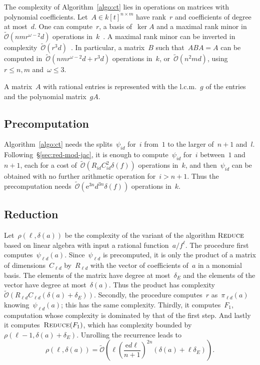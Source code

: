 \documentclass{sig-alternate}
\newcommand{\Reduce}{\mathop{\textsc{Reduce}}}
\newcommand{\softO}{\tilde{\mathcal{O}}}
\newcommand{\eexp}{\mathrm{e}}
\begin{document}
\noindent The complexity of Algorithm~\ref{algo:ct} lies in operations on matrices with polynomial coefficients.
Let~$A\in k[t]^{n\times m}$ have rank~$r$ and coefficients of degree at most~$d$.
One can compute~$r$, a basis of~$\ker A$ and a maximal rank minor in~$\softO(n m r^{\omega-2} d)$ operations in~$k$~\cite{Zho13}.
A maximal rank minor can be inverted in complexity~$\softO(r^3 d)$~\cite{JeaVil05}.
In particular, a matrix~$B$ such that~$ABA=A$ can be computed in~$ \softO(n m r^{\omega-2} d + r^3 d)$ operations in~$k$, or~$\softO(n^2md)$, using~$r\leqslant n,m$ and~$\omega\leqslant3$.


A matrix~$A$ with rational entries is represented with the l.c.m.~$g$ of the entries and the polynomial matrix~$g A$. 
\subsection{Precomputation}

\noindent Algorithm~\ref{algo:ct} needs the splits~$\psi_{id}$ for~$i$ from~$1$ to the larger of~$n+1$ and~$l$.
Following~\S\ref{sec:red-mod-jac}, it is enough to compute~$\psi_{id}$ for~$i$ between~$1$ and~$n+1$, each for a cost of~$\softO(R_{id}C_{id}^2\delta(f))$ operations in~$k$,
and then~$\psi_{id}$ can be obtained with no further arithmetic operation for~$i>n+1$.
Thus the precomputation needs~$\softO\left( \eexp^{3n}d^{3n}\delta(f) \right)$  operations in~$k$.

\subsection{Reduction}

\noindent Let~$\rho(\ell, \delta(a))$ be the complexity of the variant of the algorithm $\Reduce$ based on linear algebra with input a rational function~$a/f^\ell$.
The procedure first computes~$\psi_{\ell d}(a)$. Since~$\psi_{\ell d}$ is precomputed, it is only the product of a matrix of dimensions~$C_{\ell d}$ by~$R_{\ell d}$ with the vector of coefficients of~$a$ in a monomial basis.
The elements of the matrix have degree at most~$\delta_E$ and the elements of the vector have degree at most~$\delta(a)$.
Thus the product has complexity~$\softO(R_{\ell d}C_{\ell d}(\delta(a)+\delta_E))$.
Secondly, the procedure computes~$r$ as~$\pi_{\ell d}(a)$ knowing~$\psi_{\ell d}(a)$; this has the same complexity.
Thirdly, it computes~$F_1$, computation whose complexity is dominated by that of the first step. And lastly it computes~$\Reduce(F_1)$, which has complexity bounded by~$\rho(\ell-1, \delta(a)+\delta_E)$.
Unrolling the recurrence leads to
\[ \rho(\ell, \delta(a)) = \softO\left( \ell \left(  \frac{\eexp d \ell}{n+1} \right)^{2n} \left( \delta(a) + \ell \delta_E \right) \right). \]
\end{document}
